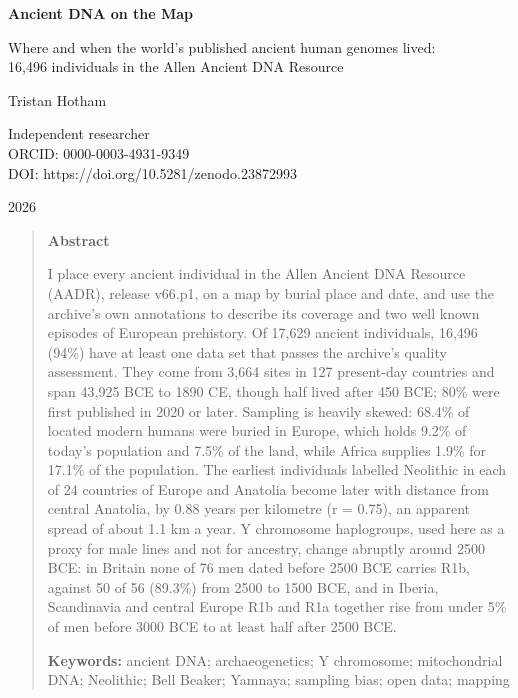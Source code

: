 \documentclass[11pt,a4paper]{article}
\begin{document}
\begin{center}
{\Large\bfseries Ancient DNA on the Map\par}
\vspace{0.4em}
{\large Where and when the world's published ancient human genomes lived:\\16,496 individuals in the Allen Ancient DNA Resource\par}
\vspace{1.2em}
{\large Tristan Hotham\par}
\vspace{0.3em}
{\small Independent researcher\\
ORCID: 0000-0003-4931-9349\\
DOI: https://doi.org/10.5281/zenodo.23872993\par}
\vspace{0.8em}
2026
\end{center}

\begin{quote}
\small
\begin{center}\textbf{Abstract}\end{center}
I place every ancient individual in the Allen Ancient DNA Resource (AADR), release v66.p1, on a map by burial place and date, and use the archive's own annotations to describe its coverage and two well known episodes of European prehistory. Of 17,629 ancient individuals, 16,496 (94\%) have at least one data set that passes the archive's quality assessment. They come from 3,664 sites in 127 present-day countries and span 43,925 BCE to 1890 CE, though half lived after 450 BCE; 80\% were first published in 2020 or later. Sampling is heavily skewed: 68.4\% of located modern humans were buried in Europe, which holds 9.2\% of today's population and 7.5\% of the land, while Africa supplies 1.9\% for 17.1\% of the population. The earliest individuals labelled Neolithic in each of 24 countries of Europe and Anatolia become later with distance from central Anatolia, by 0.88 years per kilometre (r = 0.75), an apparent spread of about 1.1 km a year. Y chromosome haplogroups, used here as a proxy for male lines and not for ancestry, change abruptly around 2500 BCE: in Britain none of 76 men dated before 2500 BCE carries R1b, against 50 of 56 (89.3\%) from 2500 to 1500 BCE, and in Iberia, Scandinavia and central Europe R1b and R1a together rise from under 5\% of men before 3000 BCE to at least half after 2500 BCE.

\textbf{Keywords:} ancient DNA; archaeogenetics; Y chromosome; mitochondrial DNA; Neolithic; Bell Beaker; Yamnaya; sampling bias; open data; mapping
\end{quote}
\end{document}
